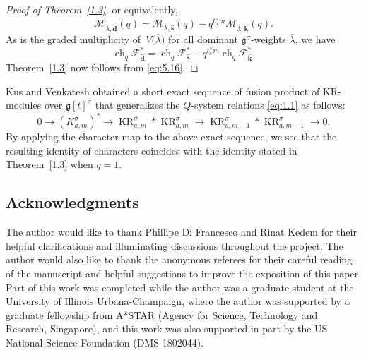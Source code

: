 \documentclass[pdftex]{sigma}
\numberwithin{equation}{section}
\DeclareMathOperator{\KR}{KR}
\DeclareMathOperator{\ch}{ch}
\begin{document}
\begin{proof}[Proof of Theorem~\ref{1.3}]
or equivalently,
\[
\mathcal{M}_{\overline{\lambda},\widehat{\mathbf{d}}}(q)
=\mathcal{M}_{\overline{\lambda},\widehat{\mathbf{s}}}(q)
-q^{t_a^{\vee}m}\mathcal{M}_{\overline{\lambda},\widehat{\mathbf{k}}}(q).
\]
As  is the graded multiplicity of~$V\bigl(\overline{\lambda}\bigr)$ for all dominant $\mathfrak{g}^{\sigma}$-weights $\overline{\lambda}$, we have
\begin{equation}\label{eq:5.16}
\ch_q\mathcal{F}_{\widehat{\mathbf{d}}}^*
=\ch_q\mathcal{F}_{\widehat{\mathbf{s}}}^*
-q^{t_a^{\vee}m}\ch_q\mathcal{F}_{\widehat{\mathbf{k}}}^*.
\end{equation}
Theorem~\ref{1.3} now follows from \eqref{eq:5.16}.
\end{proof}

\begin{remark*}
Kus and Venkatesh \cite[Proposition 7.3]{KV16} obtained a short exact sequence of fusion product of KR-modules over $\mathfrak{g}[t]^{\sigma}$ that generalizes the  $Q$-system relations \eqref{eq:1.1} as follows:
\begin{equation*}
0\longrightarrow(K_{a,m}^{\sigma})^*\longrightarrow\KR_{a,m}^{\sigma}*\KR_{a,m}^{\sigma}\longrightarrow\KR_{a,m+1}^{\sigma}*\KR_{a,m-1}^{\sigma}\longrightarrow0.
\end{equation*}
By applying the character map to the above exact sequence, we see that the resulting identity of characters coincides with the identity stated in Theorem~\ref{1.3} when $q=1$.
\end{remark*}

\subsection*{Acknowledgments}

The author would like to thank Phillipe Di Francesco and Rinat Kedem for their helpful clarifications and illuminating discussions throughout the project. The author would also like to thank the anonymous referees for their careful reading of the manuscript and helpful suggestions to improve the exposition of this paper. Part of this work was completed while the author was a graduate student at the University of Illinois Urbana-Champaign, where the author was supported by a graduate fellowship from A*STAR (Agency for Science, Technology and Research, Singapore), and this work was also supported in part by the US National Science Foundation (DMS-1802044).
\end{document}
